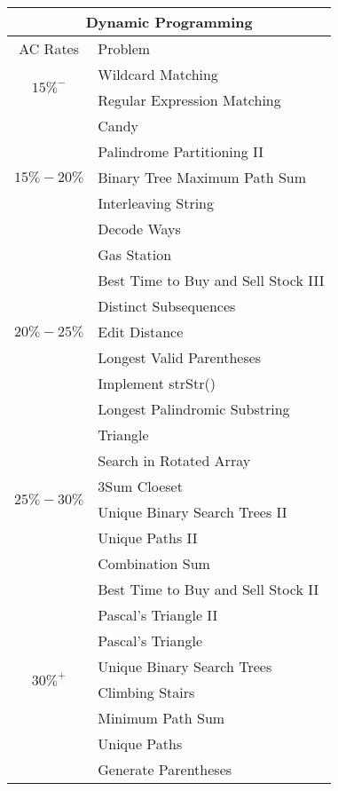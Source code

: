 \documentclass[paper=a4, fontsize=11pt]{scrartcl} %
\begin{document}
\begin{center}
  \begin{tabular}{|c|l|}
      \hline
      \multicolumn{2}{|c|}{Dynamic Programming} \\
      \hline
      AC Rates      &   Problem     \\
      \hline
      \multirow{2}{*}{$15\%^-$}  &   Wildcard Matching\\
          & Regular Expression Matching\\
      \hline
      \multirow{5}{*}{$15\%-20\%$}  &   Candy\\
          & Palindrome Partitioning II  \\
          & Binary Tree Maximum Path Sum \\
          & Interleaving String\\
          & Decode Ways\\
      \hline
      \multirow{7}{*}{$20\%-25\%$}  &   Gas Station    \\
          & Best Time to Buy and Sell Stock III\\
          & Distinct Subsequences \\
          & Edit Distance\\
          & Longest Valid Parentheses\\
          & Implement strStr()\\
          & Longest Palindromic Substring\\

      \multirow{6}{*}{$25\%-30\%$}  &   Triangle\\
          & Search in Rotated Array\\
          & 3Sum Cloeset\\
          & Unique Binary Search Trees II\\
          & Unique Paths II\\
          & Combination Sum\\
      \hline
      \multirow{8}{*}{$30\%^+$}  &   Best Time to Buy and Sell Stock II \\
          & Pascal's Triangle II \\
          & Pascal's Triangle \\
          & Unique Binary Search Trees \\
          & Climbing Stairs\\
          & Minimum Path Sum\\
          & Unique Paths\\
          & Generate Parentheses\\
      \hline
  \end{tabular}


\end{center}
\end{document}

